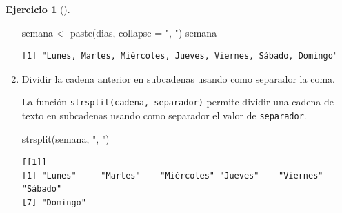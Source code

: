 \documentclass[
  spanish,
  a4paper,
]{scrreport}
\newenvironment{Shaded}{\begin{snugshade}}{\end{snugshade}}
\newcommand{\AttributeTok}[1]{\textcolor[rgb]{0.40,0.45,0.13}{#1}}
\newcommand{\FunctionTok}[1]{\textcolor[rgb]{0.28,0.35,0.67}{#1}}
\newcommand{\NormalTok}[1]{\textcolor[rgb]{0.00,0.23,0.31}{#1}}
\newcommand{\OtherTok}[1]{\textcolor[rgb]{0.00,0.23,0.31}{#1}}
\newcommand{\StringTok}[1]{\textcolor[rgb]{0.13,0.47,0.30}{#1}}
\theoremstyle{definition}
\newtheorem{exercise}{Ejercicio}[chapter]
\theoremstyle{remark}
\begin{document}
\begin{exercise}[]
\begin{enumerate}
\begin{tcolorbox}
\begin{Shaded}
\begin{Highlighting}[]
\NormalTok{semana }\OtherTok{\textless{}{-}} \FunctionTok{paste}\NormalTok{(dias, }\AttributeTok{collapse =} \StringTok{", "}\NormalTok{)}
\NormalTok{semana}
\end{Highlighting}
\end{Shaded}

\begin{verbatim}
[1] "Lunes, Martes, Miércoles, Jueves, Viernes, Sábado, Domingo"
\end{verbatim}

  \end{tcolorbox}
\item
  Dividir la cadena anterior en subcadenas usando como separador la
  coma.

  \begin{tcolorbox}[enhanced jigsaw, colback=white, opacityback=0, title=\textcolor{quarto-callout-tip-color}{\faLightbulb}\hspace{0.5em}{Solución}, toprule=.15mm, titlerule=0mm, breakable, toptitle=1mm, colframe=quarto-callout-tip-color-frame, coltitle=black, opacitybacktitle=0.6, bottomrule=.15mm, arc=.35mm, colbacktitle=quarto-callout-tip-color!10!white, leftrule=.75mm, bottomtitle=1mm, rightrule=.15mm, left=2mm]

  La función \texttt{strsplit(cadena,\ separador)} permite dividir una
  cadena de texto en subcadenas usando como separador el valor de
  \texttt{separador}.

\begin{Shaded}
\begin{Highlighting}[]
\FunctionTok{strsplit}\NormalTok{(semana, }\StringTok{", "}\NormalTok{)}
\end{Highlighting}
\end{Shaded}

\begin{verbatim}
[[1]]
[1] "Lunes"     "Martes"    "Miércoles" "Jueves"    "Viernes"   "Sábado"   
[7] "Domingo"  
\end{verbatim}

  \end{tcolorbox}
\end{enumerate}

\end{exercise}
\end{document}
